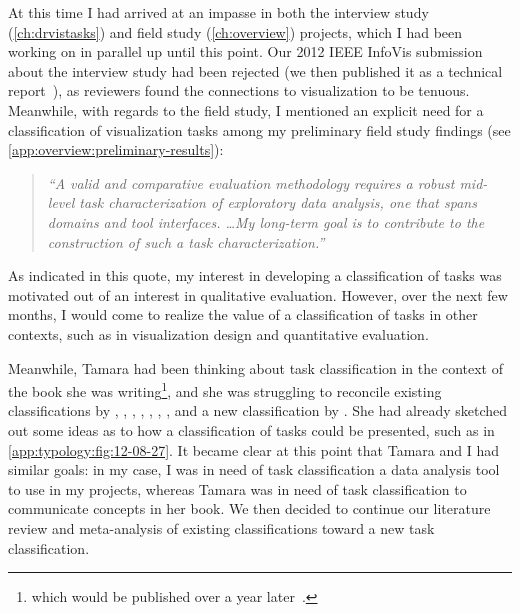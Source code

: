 At this time I had arrived at an impasse in both the interview study (\autoref{ch:drvistasks}) and field study (\autoref{ch:overview}) projects, which I had been working on in parallel up until this point.
Our 2012 IEEE InfoVis submission about the interview study had been rejected (we then published it as a technical report~\cite{Sedlmair2012b}), as reviewers found the connections to visualization to be tenuous. 
Meanwhile, with regards to the field study, I mentioned an explicit need for a classification of visualization tasks among my preliminary field study findings (see \autoref{app:overview:preliminary-results}):

\begin{quotation}
    {\it ``A valid and comparative evaluation methodology requires a robust mid-level task characterization of exploratory data analysis, one that spans domains and tool interfaces. \ldots My long-term goal is to contribute to the construction of such a task characterization.''} 
\end{quotation}

As indicated in this quote, my interest in developing a classification of tasks was motivated out of an interest in qualitative evaluation.
However, over the next few months, I would come to realize the value of a classification of tasks in other contexts, such as in visualization design and quantitative evaluation.

Meanwhile, Tamara had been thinking about task classification in the context of the book she was writing\footnote{which would be published over a year later~\cite{Munzner2014}.}, and she was struggling to reconcile existing classifications by \citet{Amar2004}, \citet{Amar2005}, \citet{Casner1991}, \citet{Lee2006}, \citet{Shneiderman1996}, \citet{Wehrend1990}, \citet{Yi2007}, \citet{Zhou1998} and a new classification by \citet{Heer2012}.
She had already sketched out some ideas as to how a classification of tasks could be presented, such as in \autoref{app:typology:fig:12-08-27}.
It became clear at this point that Tamara and I had similar goals: in my case, I was in need of task classification a data analysis tool to use in my projects, whereas Tamara was in need of task classification to communicate concepts in her book.
We then decided to continue our literature review and meta-analysis of existing classifications toward a new task classification.


